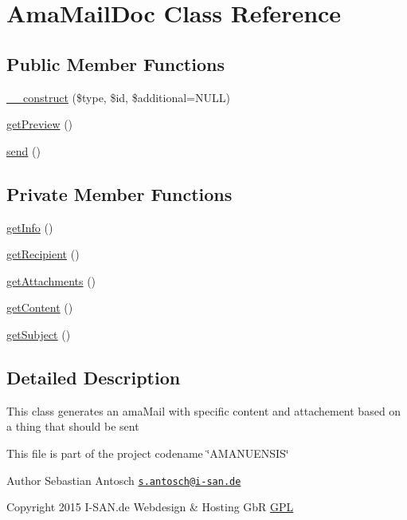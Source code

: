 \hypertarget{a00007}{}\section{Ama\+Mail\+Doc Class Reference}
\label{a00007}
\subsection*{Public Member Functions}
\begin{DoxyCompactItemize}
\item 
\hyperlink{a00007_ab3a7841df012540f33bfd8c277801e2d}{\+\_\+\+\_\+construct} (\$type, \$id, \$additional=N\+U\+L\+L)
\item 
\hyperlink{a00007_ab858356a1ff88c3d4efe48f1bf3a9028}{get\+Preview} ()
\item 
\hyperlink{a00007_a12bcef5130168b80d3d52dc82213f19a}{send} ()
\end{DoxyCompactItemize}
\subsection*{Private Member Functions}
\begin{DoxyCompactItemize}
\item 
\hyperlink{a00007_a164026f74736817927e1cacd282a2e28}{get\+Info} ()
\item 
\hyperlink{a00007_a14ad3e290231897f1be73086b9912fbc}{get\+Recipient} ()
\item 
\hyperlink{a00007_aa91862c4e237ee5b53083f41633babb6}{get\+Attachments} ()
\item 
\hyperlink{a00007_a58e43f09a06ce4e29b192c4e17ce7915}{get\+Content} ()
\item 
\hyperlink{a00007_a7ec8f5b794ded8f3c0df9afd96c8233c}{get\+Subject} ()
\end{DoxyCompactItemize}


\subsection{Detailed Description}
This class generates an ama\+Mail with specific content and attachement based on a thing that should be sent

This file is part of the project codename \char`\"{}\+A\+M\+A\+N\+U\+E\+N\+S\+I\+S\char`\"{}

\begin{DoxyAuthor}{Author}
Sebastian Antosch \href{mailto:s.antosch@i-san.de}{\tt s.\+antosch@i-\/san.\+de} 
\end{DoxyAuthor}
\begin{DoxyCopyright}{Copyright}
2015 I-\/\+S\+A\+N.\+de Webdesign \& Hosting Gb\+R \hyperlink{}{G\+P\+L }
\end{DoxyCopyright}



